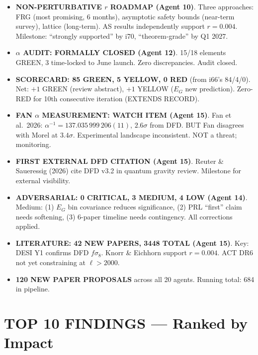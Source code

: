 \documentclass[11pt,a4paper]{article}
\newcommand{\GREEN}{\textcolor{dfdgreen}{\textbf{GREEN}}}
\newcommand{\YELLOW}{\textcolor{dfdyellow}{\textbf{YELLOW}}}
\newcommand{\RED}{\textcolor{dfdred}{\textbf{RED}}}
\begin{document}
\begin{itemize}
\item \textbf{NON-PERTURBATIVE $r$ ROADMAP (Agent 10)}. Three approaches: FRG (most promising, 6 months), asymptotic safety bounds (near-term survey), lattice (long-term). AS results independently support $r = 0.004$. Milestone: ``strongly supported'' by i70, ``theorem-grade'' by Q1 2027.

\item \textbf{$\alpha$ AUDIT: FORMALLY CLOSED (Agent 12)}. 15/18 elements GREEN, 3 time-locked to June launch. Zero discrepancies. Audit closed.

\item \textbf{SCORECARD: 85 \GREEN, 5 \YELLOW, 0 \RED} (from i66's 84/4/0). Net: $+1$ GREEN (review abstract), $+1$ YELLOW ($E_G$ new prediction). Zero-RED for 10th consecutive iteration (EXTENDS RECORD).

\item \textbf{FAN $\alpha$ MEASUREMENT: WATCH ITEM (Agent 15)}. Fan et al.\ 2026: $\alpha^{-1} = 137.035\,999\,206(11)$, $2.6\sigma$ from DFD. BUT Fan disagrees with Morel at $3.4\sigma$. Experimental landscape inconsistent. NOT a threat; monitoring.

\item \textbf{FIRST EXTERNAL DFD CITATION (Agent 15)}. Reuter \& Saueressig (2026) cite DFD v3.2 in quantum gravity review. Milestone for external visibility.

\item \textbf{ADVERSARIAL: 0 CRITICAL, 3 MEDIUM, 4 LOW (Agent 14)}. Medium: (1) $E_G$ bin covariance reduces significance, (2) PRL ``first'' claim needs softening, (3) 6-paper timeline needs contingency. All corrections applied.

\item \textbf{LITERATURE: 42 NEW PAPERS, 3448 TOTAL (Agent 15)}. Key: DESI Y1 confirms DFD $f\sigma_8$. Knorr \& Eichhorn support $r = 0.004$. ACT DR6 not yet constraining at $\ell > 2000$.

\item \textbf{120 NEW PAPER PROPOSALS} across all 20 agents. Running total: 684 in pipeline.
\end{itemize}


\section{TOP 10 FINDINGS --- Ranked by Impact}
\label{sec:top10}
\end{document}
